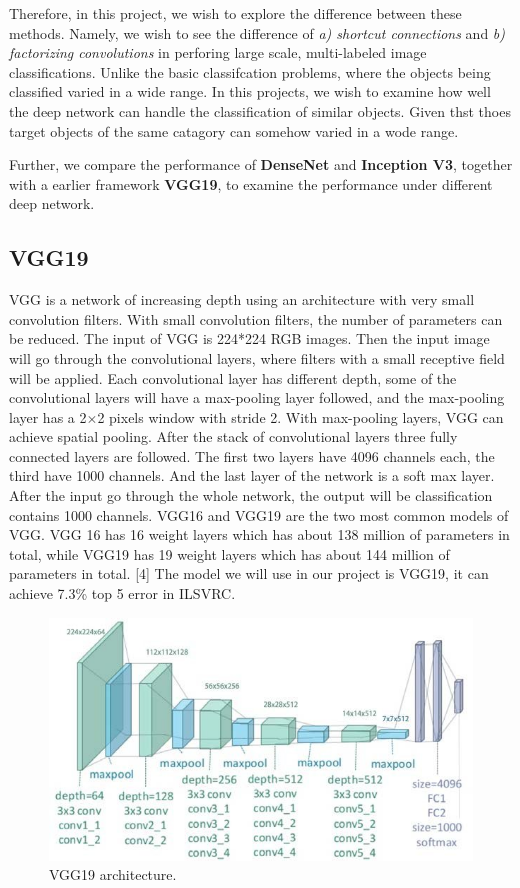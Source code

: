 \documentclass{article}
\begin{document}
Therefore, in this project, we wish to explore the difference between these methods. 
Namely, we wish to see the difference of \emph{a) shortcut connections} and \emph{b) factorizing convolutions} in perforing large scale, multi-labeled image classifications.
Unlike the basic classifcation problems, where the objects being classified varied in a wide range.  
In this projects, we wish to examine how well the deep network can handle the classification of similar objects. Given thst thoes target objects of the same catagory can somehow varied in a wode range. 

Further, we compare the performance of \textbf{DenseNet} and \textbf{Inception V3}, together with a earlier framework \textbf{VGG19}, to examine the performance under different deep network.

\subsection{VGG19}
VGG is a network of increasing depth using an architecture with very small convolution filters. With small convolution filters, the number of parameters can be reduced. The input of VGG is 224*224 RGB images. Then the input image will go through the convolutional layers, where filters with a small receptive field will be applied. Each convolutional layer has different depth, some of the convolutional layers will have a max-pooling layer followed, and the max-pooling layer has a 2$\times$2 pixels window with stride 2. With max-pooling layers, VGG can achieve spatial pooling. After the stack of convolutional layers three fully connected layers are followed. The first two layers have 4096 channels each, the third have 1000 channels. And the last layer of the network is a soft max layer. After the input go through the whole network, the output will be classification contains 1000 channels. VGG16 and VGG19 are the two most common models of VGG. VGG 16 has 16 weight layers which has about 138 million of parameters in total, while VGG19 has 19 weight layers which has about 144 million of parameters in total. [4] The model we will use in our project is VGG19, it can achieve 7.3\% top 5 error in ILSVRC.

\begin{figure}[H]
	\centering
	\includegraphics[width=0.8\linewidth]{pics/vgg} 
	\caption{VGG19 architecture.}
\end{figure}
\end{document}
